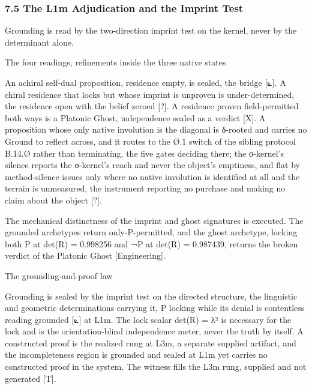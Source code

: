 \documentclass[10pt,twocolumn]{article}
\begin{document}
\hypertarget{the-l1m-adjudication-and-the-imprint-test}{%
\subsubsection{7.5 The L1m Adjudication and the Imprint
Test}\label{the-l1m-adjudication-and-the-imprint-test}}

Grounding is read by the two-direction imprint test on the kernel, never
by the determinant alone.

\begin{jbox}{The four readings, refinements inside the three native states}

An achiral self-dual proposition, residence empty, is sealed, the bridge
{[}⟀{]}. A chiral residence that locks but whose imprint is unproven is
under-determined, the residence open with the belief zeroed {[}?{]}. A
residence proven field-permitted both ways is a Platonic Ghost,
independence sealed as a verdict {[}X{]}. A proposition whose only
native involution is the diagonal is δ-rooted and carries no Ground to
reflect across, and it routes to the Ø.1 switch of the sibling protocol
B.14.Ø rather than terminating, the five gates deciding there; the
σ-kernel's silence reports the σ-kernel's reach and never the object's
emptiness, and flat by method-silence issues only where no native
involution is identified at all and the terrain is unmeasured, the
instrument reporting no purchase and making no claim about the object
{[}?{]}.

\end{jbox}

The mechanical distinctness of the imprint and ghost signatures is
executed. The grounded archetypes return only-P-permitted, and the ghost
archetype, locking both P at det(R) = 0.998256 and ¬P at det(R) =
0.987439, returns the broken verdict of the Platonic Ghost
{[}Engineering{]}.

\begin{jbox}{The grounding-and-proof law}

Grounding is sealed by the imprint test on the directed structure, the
linguistic and geometric determinations carrying it, P locking while its
denial is contentless reading grounded {[}⟀{]} at L1m. The lock scalar
det(R) = λ² is necessary for the lock and is the orientation-blind
independence meter, never the truth by itself. A constructed proof is
the realized rung at L3m, a separate supplied artifact, and the
incompleteness region is grounded and sealed at L1m yet carries no
constructed proof in the system. The witness fills the L3m rung,
supplied and not generated {[}T{]}.

\end{jbox}
\end{document}
